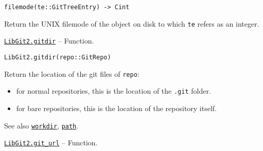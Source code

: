 \begin{adjustwidth}{2em}{0pt}


\begin{verbatim}
filemode(te::GitTreeEntry) -> Cint
\end{verbatim}

Return the UNIX filemode of the object on disk to which \texttt{te} refers as an integer.



\end{adjustwidth}
\hypertarget{12125979754140967861}{} 
\hyperlink{12125979754140967861}{\texttt{LibGit2.gitdir}}  -- {Function.}

\begin{adjustwidth}{2em}{0pt}


\begin{verbatim}
LibGit2.gitdir(repo::GitRepo)
\end{verbatim}

Return the location of the {\textquotedbl}git{\textquotedbl} files of \texttt{repo}:

\begin{itemize}
\item for normal repositories, this is the location of the \texttt{.git} folder.


\item for bare repositories, this is the location of the repository itself.

\end{itemize}
See also \hyperlink{6689577338311178757}{\texttt{workdir}}, \hyperlink{7655803558162329563}{\texttt{path}}.



\end{adjustwidth}
\hypertarget{12071312184635750746}{} 
\hyperlink{12071312184635750746}{\texttt{LibGit2.git\_url}}  -- {Function.}

